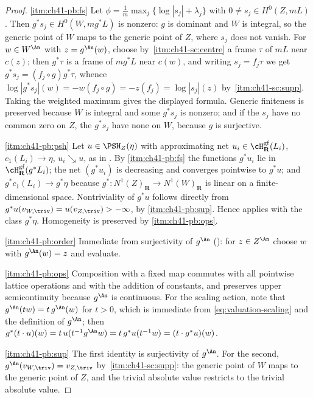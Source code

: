 \begin{proof}
\cref{itm:ch41-pb:fs}  Let
$\phi=\frac1m\max_j\{\log|s_j|+\lambda_j\}$ with
$0\ne s_j\in H^0(Z,mL)$.  Then $g^*s_j\in H^0(W,mg^*L)$ is nonzero:
$g$ is dominant and $W$ is integral, so the generic point of $W$ maps
to the generic point of $Z$, where $s_j$ does not vanish.  For
$w\in W^{\An}$ with $z=g^{\An}(w)$, choose by
\,\cref{itm:ch41-sc:centre} a frame
$\tau$ of $mL$ near $c(z)$; then $g^*\tau$ is a frame of
$mg^*L$ near $c(w)$, and writing $s_j=f_j\tau$ we get
$g^*s_j=(f_j\circ g)g^*\tau$, whence
$\log|g^*s_j|(w)=-w(f_j\circ g)=-z(f_j)=\log|s_j|(z)$ by
\,\cref{itm:ch41-sc:supp}.  Taking the
weighted maximum gives the displayed formula.  Generic finiteness is
preserved because $W$ is integral and some $g^*s_j$ is nonzero; and if
the $s_j$ have no common zero on $Z$, the $g^*s_j$ have none on
$W$, because $g$ is surjective.

\cref{itm:ch41-pb:psh}  Let $u\in\PSH_Z(\eta)$ with approximating net
$u_i\in\cH^{\mathrm{gf}}_{\mathbf R}(L_i)$, $c_1(L_i)\to\eta$,
$u_i\searrow u$, as in .  By \cref{itm:ch41-pb:fs} the
functions $g^*u_i$ lie in $\cH^{\mathrm{gf}}_{\mathbf R}(g^*L_i)$; the
net $(g^*u_i)$ is decreasing and converges pointwise to $g^*u$; and
$g^*c_1(L_i)\to g^*\eta$ because
$g^*:N^1(Z)_{\mathbf R}\to N^1(W)_{\mathbf R}$ is linear on a
finite-dimensional space.  Nontriviality of $g^*u$ follows directly from
$g^*u(v_{W,\triv})=u(v_{Z,\triv})>-\infty$, by
\cref{itm:ch41-pb:sup}.  Hence
 applies with the class $g^*\eta$.  Homogeneity is
preserved by \cref{itm:ch41-pb:ops}.

\cref{itm:ch41-pb:order}  Immediate from surjectivity of $g^{\An}$
(): for $z\in Z^{\An}$ choose $w$ with
$g^{\An}(w)=z$ and evaluate.

\cref{itm:ch41-pb:ops}  Composition with a fixed map commutes with all
pointwise lattice operations and with the addition of constants, and
preserves upper semicontinuity because $g^{\An}$ is continuous.  For the
scaling action, note that $g^{\An}(tw)=t\,g^{\An}(w)$ for $t>0$, which
is immediate from \eqref{eq:valuation-scaling} and the definition of
$g^{\An}$; then
$g^*(t\cdot u)(w)=t\,u(t^{-1}g^{\An}w)=t\,g^*u(t^{-1}w)
=(t\cdot g^*u)(w)$.

\cref{itm:ch41-pb:sup}  The first identity is surjectivity of $g^{\An}$.
For the second, $g^{\An}(v_{W,\triv})=v_{Z,\triv}$ by
\,\cref{itm:ch41-sc:supp}: the generic
point of $W$ maps to the generic point of $Z$, and the trivial absolute
value restricts to the trivial absolute value.
\end{proof}

